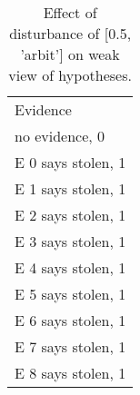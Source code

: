 \begin{table}\begin{tabular}{l}\toprule\multirow{2}{*}{Evidence} \\\\\midrule
no evidence, 0 & \\E 0 says stolen, 1 & \\E 1 says stolen, 1 & \\E 2 says stolen, 1 & \\E 3 says stolen, 1 & \\E 4 says stolen, 1 & \\E 5 says stolen, 1 & \\E 6 says stolen, 1 & \\E 7 says stolen, 1 & \\E 8 says stolen, 1 & \\\bottomrule\end{tabular}\caption{Effect of disturbance of [0.5, 'arbit'] on weak view of hypotheses.}\end{table}